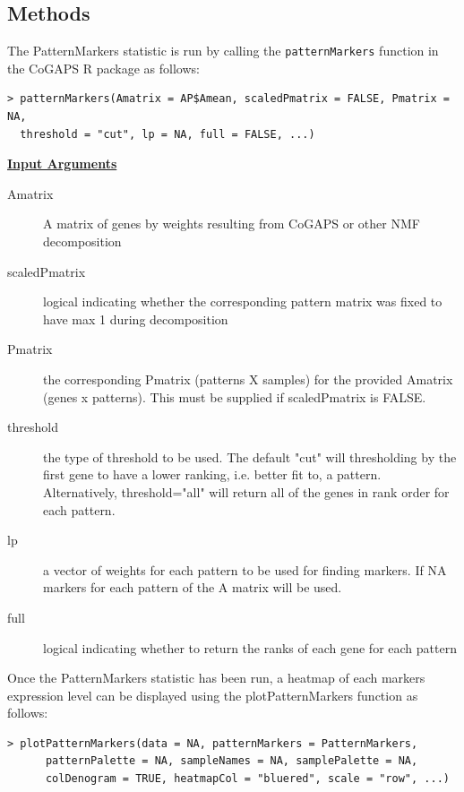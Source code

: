 \documentclass{report}
\begin{document}
\subsection{Methods}

\par The PatternMarkers statistic is run by calling the \texttt{patternMarkers} function in the CoGAPS R package as follows:

\begin{verbatim}
> patternMarkers(Amatrix = AP$Amean, scaledPmatrix = FALSE, Pmatrix = NA,
  threshold = "cut", lp = NA, full = FALSE, ...)
\end{verbatim}

\par \noindent \textbf{\underline{Input Arguments}}
\begin{description}
\item[Amatrix]{A matrix of genes by weights resulting from CoGAPS or other NMF decomposition}
\item[scaledPmatrix]{logical indicating whether the corresponding pattern matrix was fixed to have max 1 during decomposition}
\item[Pmatrix]{the corresponding Pmatrix (patterns X samples) for the provided Amatrix (genes x patterns). This must be supplied if scaledPmatrix is FALSE.}
\item[threshold]{the type of threshold to be used. The default "cut" will thresholding by the first gene to have a lower ranking, i.e. better fit to, a pattern. Alternatively, threshold="all" will return all of the genes in rank order for each pattern.}
\item[lp]{a vector of weights for each pattern to be used for finding markers. If NA markers for each pattern of the A matrix will be used.}
\item[full]{logical indicating whether to return the ranks of each gene for each pattern}
\end{description}

\par Once the PatternMarkers statistic has been run, a heatmap of each markers expression level can be displayed using the plotPatternMarkers function as follows:

\begin{verbatim}
> plotPatternMarkers(data = NA, patternMarkers = PatternMarkers,
      patternPalette = NA, sampleNames = NA, samplePalette = NA,
      colDenogram = TRUE, heatmapCol = "bluered", scale = "row", ...)
\end{verbatim}
\end{document}
